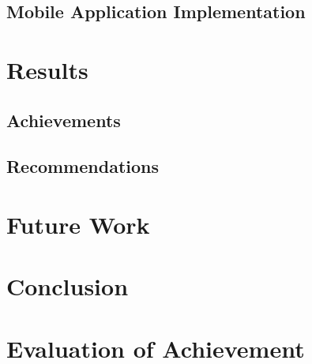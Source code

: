 \documentclass{article}
\begin{document}
		\subsection{Mobile Application Implementation}
			\lipsum[1]
			
	\section{Results}
		\subsection{Achievements}
			\lipsum[1]
			
		\subsection{Recommendations}
			\lipsum[1]
			
	\section{Future Work}
		\lipsum[1]
	
	\section{Conclusion}
		\lipsum[1]
		
	\section{Evaluation of Achievement}
		\lipsum[1]
		
\end{document}
